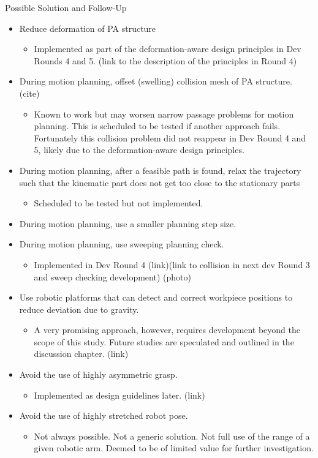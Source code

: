 Possible Solution and Follow-Up
\begin{itemize}
    \item Reduce deformation of PA structure
    \begin{itemize}
        \item Implemented as part of the deformation-aware design principles in Dev Rounds 4 and 5. (link to the description of the principles in Round 4)
    \end{itemize}
    \item During motion planning, offset (swelling) collision mesh of PA structure. (cite)
    \begin{itemize}
        \item Known to work but may worsen narrow passage problems for motion planning. This is scheduled to be tested if another approach fails. Fortunately this collision problem did not reappear in Dev Round 4 and 5, likely due to the deformation-aware design principles.
    \end{itemize}
    \item During motion planning, after a feasible path is found, relax the trajectory such that the kinematic part does not get too close to the stationary parts
    \begin{itemize}
        \item Scheduled to be tested but not implemented.
    \end{itemize}
    \item During motion planning, use a smaller planning step size.
    \item During motion planning, use sweeping planning check.
    \begin{itemize}
        \item Implemented in Dev Round 4 (link)(link to collision in next dev Round 3 and sweep checking development) (photo)
    \end{itemize}
    \item Use robotic platforms that can detect and correct workpiece positions to reduce deviation due to gravity.
    \begin{itemize}
        \item A very promising approach, however, requires development beyond the scope of this study. Future studies are speculated and outlined in the discussion chapter. (link)
    \end{itemize}
    \item Avoid the use of highly asymmetric grasp. 
    \begin{itemize}
        \item Implemented as design guidelines later. (link)
    \end{itemize}
    \item Avoid the use of highly stretched robot pose. 
    \begin{itemize}
        \item Not always possible. Not a generic solution. Not full use of the range of a given robotic arm. Deemed to be of limited value for further investigation.
    \end{itemize}
\end{itemize}

